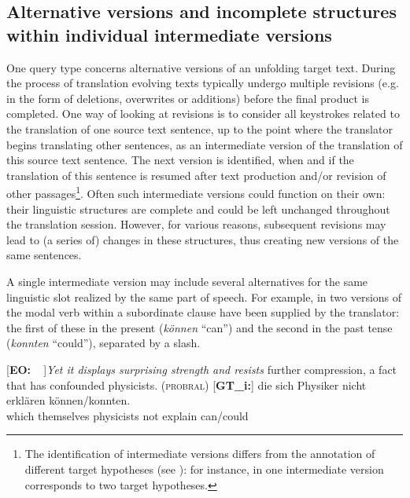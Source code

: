 \documentclass[output=paper]{LSP/langsci}
\begin{document}
\subsection{Alternative versions and incomplete structures within individual intermediate versions} \label{sec:1:3:1}
One query type concerns alternative versions of an unfolding target text. During the process of translation evolving texts typically undergo multiple revisions (e.g. in the form of deletions, overwrites or additions) before the final product is completed. One way of looking at revisions is to consider all keystrokes related to the translation of one source text sentence, up to the point where the translator begins translating other sentences, as an intermediate version of the translation of this source text sentence. The next version is identified, when and if the translation of this sentence is resumed after text production and/or revision of other passages\footnote{The identification of intermediate versions differs from the annotation of different target hypotheses (see ): for instance, in  one intermediate version corresponds to two target hypotheses.}. Often such intermediate versions could function on their own: their linguistic structures are complete and could be left unchanged throughout the translation session. However, for various reasons, subsequent revisions may lead to (a series of) changes in these structures, thus creating new versions of the same sentences.

A single intermediate version may include several alternatives for the same linguistic slot realized by the same part of speech. For example, in  two versions of the modal verb within a subordinate clause have been supplied by the translator: the first of these in the present (\textit{können} “can”) and the second in the past tense (\textit{konnten} “could”), separated by a slash.


\ea \label{ex:1:4}
\begin{xlist}
\exi{}[\textbf{EO:~~}]{\emph{Yet it displays surprising strength and resists} further compression, a fact that has confounded physicists. (\textsc{probral})}
\exi{}[\textbf{GT\_i:}]{
\gll  [{\dots}] die\raute{} sich\raute{} Physiker\raute{} nicht\raute{} erklären\raute{} können\stern{}/konnten.\\
{}  which themselves physicists not explain can/could\\
}
\end{xlist}
\z
\end{document}
